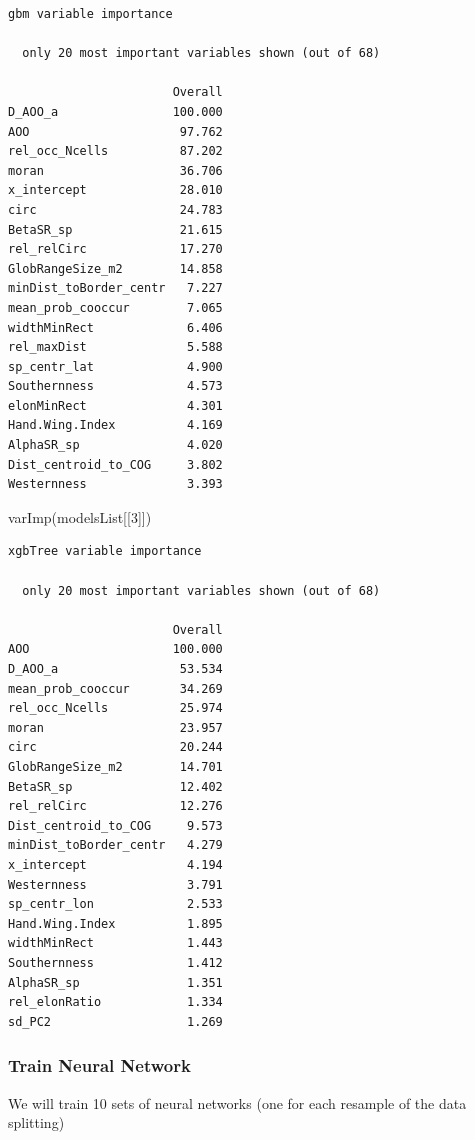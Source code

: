 \documentclass[
  letterpaper,
  DIV=11,
  numbers=noendperiod]{scrartcl}
\newenvironment{Shaded}{\begin{snugshade}}{\end{snugshade}}
\newcommand{\DecValTok}[1]{\textcolor[rgb]{0.68,0.00,0.00}{#1}}
\newcommand{\FunctionTok}[1]{\textcolor[rgb]{0.28,0.35,0.67}{#1}}
\newcommand{\NormalTok}[1]{\textcolor[rgb]{0.00,0.23,0.31}{#1}}
\begin{document}
\begin{verbatim}
gbm variable importance

  only 20 most important variables shown (out of 68)

                       Overall
D_AOO_a                100.000
AOO                     97.762
rel_occ_Ncells          87.202
moran                   36.706
x_intercept             28.010
circ                    24.783
BetaSR_sp               21.615
rel_relCirc             17.270
GlobRangeSize_m2        14.858
minDist_toBorder_centr   7.227
mean_prob_cooccur        7.065
widthMinRect             6.406
rel_maxDist              5.588
sp_centr_lat             4.900
Southernness             4.573
elonMinRect              4.301
Hand.Wing.Index          4.169
AlphaSR_sp               4.020
Dist_centroid_to_COG     3.802
Westernness              3.393
\end{verbatim}

\begin{Shaded}
\begin{Highlighting}[]
\FunctionTok{varImp}\NormalTok{(modelsList[[}\DecValTok{3}\NormalTok{]])}
\end{Highlighting}
\end{Shaded}

\begin{verbatim}
xgbTree variable importance

  only 20 most important variables shown (out of 68)

                       Overall
AOO                    100.000
D_AOO_a                 53.534
mean_prob_cooccur       34.269
rel_occ_Ncells          25.974
moran                   23.957
circ                    20.244
GlobRangeSize_m2        14.701
BetaSR_sp               12.402
rel_relCirc             12.276
Dist_centroid_to_COG     9.573
minDist_toBorder_centr   4.279
x_intercept              4.194
Westernness              3.791
sp_centr_lon             2.533
Hand.Wing.Index          1.895
widthMinRect             1.443
Southernness             1.412
AlphaSR_sp               1.351
rel_elonRatio            1.334
sd_PC2                   1.269
\end{verbatim}

\subsubsection{Train Neural Network}\label{train-neural-network}

We will train 10 sets of neural networks (one for each resample of the
data splitting)
\end{document}

